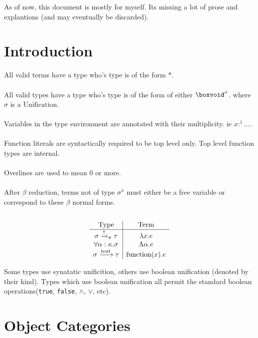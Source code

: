 \documentclass {article}
\begin{document}
As of now, this document is mostly for myself. Its missing a lot of prose and explantions (and may eventually be discarded). \\

\tableofcontents

\section{Introduction}
All valid terms have a type who's type is of the form $ * $. \\
\\
All valid types have a type who's type is of the form of either $\boxvoid^\sigma$.
where $ \sigma $ is a $ \text{Unification} $. \\
\\
Variables in the type environment are annotated with their multiplicity. ie $ x :^1 ... $. \\
\\
Function literals are syntactically required to be top level only. Top level function types are internal. \\
\\
Overlines are used to mean 0 or more. \\
\\
After $ \beta $ reduction, terms not of type $ \sigma^\pi $ must either be a free variable or correspond to these $ \beta $ normal forms. \\
\\
\begin{gather*}
\begin{array}{c | c}
\text{Type} & \text{Term} \\
\hline
\sigma \xrightarrow{\uparrow}_\pi \tau & \lambda x. e \\
\forall \alpha : \kappa. \sigma & \Lambda \alpha. e  \\
\sigma \xrightarrow{\text{text}} \tau & \text{function}(x). e \\
\end{array}
\end{gather*} 

Some types use synatatic unificition, others use boolean unification (denoted by their kind).
Types which use boolean unification all permit the standard boolean operations(\texttt{true}, \texttt{false}, $\land$, $\lor$, etc).

\section{Object Categories}
\end{document}
